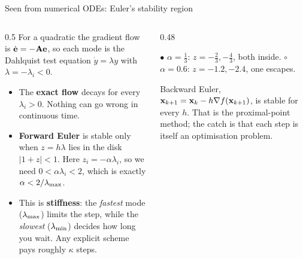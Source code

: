 \begin{frame}{Seen from numerical ODEs: Euler's stability region}
  \begin{columns}[T]
    \begin{column}{0.5\textwidth}
      \small
      For a quadratic the gradient flow is $\dot{\mathbf{e}} = -\mathbf{A}\mathbf{e}$, so each mode is the Dahlquist test equation
      $\dot y = \lambda y$ with $\lambda = -\lambda_i < 0$.
      \begin{itemize}\footnotesize
        \item The \textbf{exact flow} decays for every $\lambda_i>0$. Nothing can go wrong in continuous time.
        \item \textbf{Forward Euler} is stable only when $z = h\lambda$ lies in the disk $|1+z|<1$.
              Here $z_i = -\alpha\lambda_i$, so we need $0<\alpha\lambda_i<2$, which is exactly $\alpha<2/\lambda_{\max}$.
        \item This is \textbf{stiffness}: the \emph{fastest} mode ($\lambda_{\max}$) limits the step, while the \emph{slowest}
              ($\lambda_{\min}$) decides how long you wait. Any explicit scheme pays roughly $\kappa$ steps.
      \end{itemize}
    \end{column}
    \begin{column}{0.48\textwidth}
      \centering
      

      \footnotesize
      \textcolor{mBlue}{$\bullet$} $\alpha = \frac13$: $z = -\frac23, -\frac43$, both inside.\quad
      \textcolor{mRed}{$\circ$} $\alpha = 0.6$: $z = -1.2, -2.4$, one escapes.

      \vspace{2pt}
      Backward Euler, $\mathbf{x}_{k+1} = \mathbf{x}_k - h\nabla f(\mathbf{x}_{k+1})$, is stable for every $h$.
      That is the proximal-point method; the catch is that each step is itself an optimisation problem.
    \end{column}
  \end{columns}
\end{frame}

